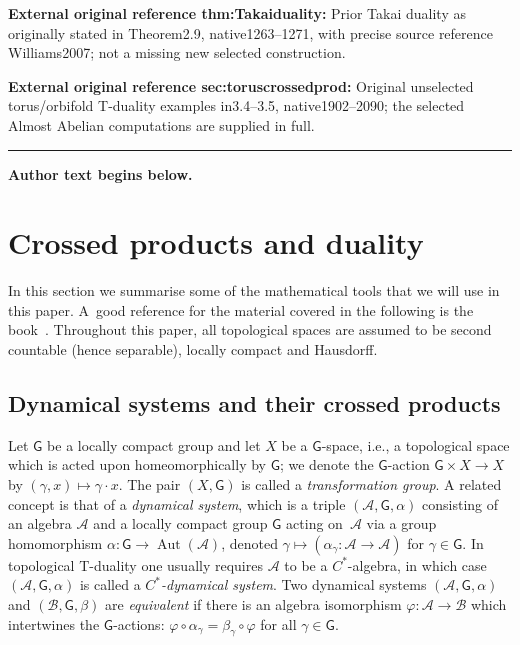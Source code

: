\documentclass[11pt]{article}
\numberwithin{equation}{section}
\numberwithin{equation}{section}
\newcommand{\sfG}{\mathsf{G}}
\newcommand{\Aut}{\operatorname{Aut}}
\def\alg{{\mathcal A}}
\def\balg{{\mathcal B}}
\begin{document}
\noindent\textbf{External original reference thm:Takaiduality:} Prior Takai duality as originally stated in Theorem2.9, native1263–1271, with precise source reference Williams2007; not a missing new selected construction.\par
\noindent\textbf{External original reference sec:toruscrossedprod:} Original unselected torus/orbifold T-duality examples in3.4–3.5, native1902–2090; the selected Almost Abelian computations are supplied in full.\par
\medskip\hrule\medskip\noindent\textbf{Author text begins below.}\par
\setcounter{section}{1}
\section{Crossed products and duality\label{sec:NAdef}}

In this section we summarise some of the mathematical tools that we
will use in this paper. A~good reference for the material covered in
the following is the book~\cite{Williams2007}. Throughout this paper,
all topological spaces are assumed to be second countable (hence
separable), locally compact and Hausdorff.

\subsection{Dynamical systems and their crossed products}

Let $\sfG$ be a locally compact group and let $X$ be a $\sfG$-space, i.e., a
topological space which is acted
upon
homeomorphically by $\sfG$; we denote the $\sfG$-action $\sfG\times
X\to X$ by $(\gamma,x)\mapsto\gamma\cdot x$. The pair $(X,\sfG)$ is
called a \emph{transformation group}.
 A related concept is that of a
\emph{dynamical system}, which is a triple $(\alg,\sfG,\alpha)$
consisting of an algebra $\alg$ and a locally compact group $\sfG$ acting
on~$\alg$ via a group homomorphism $\alpha\colon \sfG\to\Aut (\alg)$,
denoted $\gamma\mapsto(\alpha_\gamma\colon \alg\to\alg)$ for $\gamma\in
\sfG$. In topological
T-duality one usually requires $\alg$ to be a $C^*$-algebra, in which
case $(\alg,\sfG,\alpha)$ is called a \emph{$C^*$-dynamical
 system}. Two dynamical systems $(\alg,\sfG,\alpha)$ and $(\balg,\sfG,\beta)$ are
\emph{equivalent} if there is an algebra isomorphism
$\varphi\colon \alg\to\balg$ which intertwines the $\sfG$-actions: $\varphi\circ\alpha_\gamma =
\beta_\gamma\circ\varphi$ for all $\gamma\in \sfG$.
\end{document}
